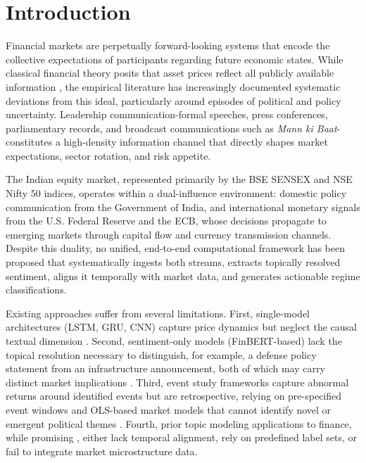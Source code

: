 \documentclass[11pt]{article}
\begin{document}
\section{Introduction}
Financial markets are perpetually forward-looking systems that encode the collective expectations of participants regarding future economic states. While classical financial theory posits that asset prices reflect all publicly available information \cite{fama1970}, the empirical literature has increasingly documented systematic deviations from this ideal, particularly around episodes of political and policy uncertainty. Leadership communication-formal speeches, press conferences, parliamentary records, and broadcast communications such as \textit{Mann ki Baat}-constitutes a high-density information channel that directly shapes market expectations, sector rotation, and risk appetite.

The Indian equity market, represented primarily by the BSE SENSEX and NSE Nifty 50 indices, operates within a dual-influence environment: domestic policy communication from the Government of India, and international monetary signals from the U.S. Federal Reserve and the ECB, whose decisions propagate to emerging markets through capital flow and currency transmission channels. Despite this duality, no unified, end-to-end computational framework has been proposed that systematically ingests both streams, extracts topically resolved sentiment, aligns it temporally with market data, and generates actionable regime classifications.

Existing approaches suffer from several limitations. First, single-model architectures (LSTM, GRU, CNN) capture price dynamics but neglect the causal textual dimension \cite{bhandari2025, nazari2025}. Second, sentiment-only models (FinBERT-based) lack the topical resolution necessary to distinguish, for example, a defense policy statement from an infrastructure announcement, both of which may carry distinct market implications \cite{paul2024, seng2023}. Third, event study frameworks capture abnormal returns around identified events but are retrospective, relying on pre-specified event windows and OLS-based market models that cannot identify novel or emergent political themes \cite{srivastava2019, kumar2024}. Fourth, prior topic modeling applications to finance, while promising \cite{buehlmaier2018, bao2019, manna2022}, either lack temporal alignment, rely on predefined label sets, or fail to integrate market microstructure data.
\end{document}
